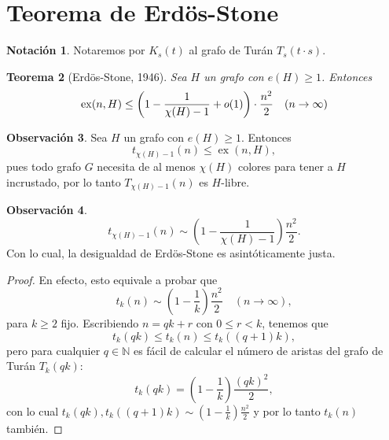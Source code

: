 \documentclass[12pt]{report}
\theoremstyle{plain}
\newtheorem{theorem}{Teorema}[section]
\theoremstyle{definition}
\newtheorem{obs}[theorem]{Observación}
\newtheorem{notation}[theorem]{Notación}
\newcommand{\naturals}{\mathbb{N}}
\newcommand{\ex}[2]{\operatorname{ex} (#1, #2)}
\begin{document}
\section{Teorema de Erdös-Stone}


\begin{notation}
Notaremos por $K_s (t)$ al grafo de Turán $T_{s} (t \cdot s)$.
\end{notation}

\begin{theorem}[Erdös-Stone, 1946]
Sea $H$ un grafo con $e(H) \geq 1$. Entonces
\[
    \ex n H \leq \left ( 1 - \frac{1}{\chi (H) - 1}  + o (1) \right) \cdot \frac{n^2}{2} \quad (n \to \infty) \\
\]
\end{theorem}

\begin{obs}
Sea $H$ un grafo con $e(H) \geq 1$. Entonces
\[
    t_{\chi (H) -1} (n) \leq \ex n H,
\]
pues todo grafo $G$ necesita de al menos $\chi (H)$ colores para tener a $H$ incrustado, por lo tanto $T_{\chi (H) - 1} (n)$ es $H$-libre.
\end{obs}

\begin{obs}\label{obs:tenemos que el numero de turan es asintotico a (1-1/r)n2/2}
\[
t_{\chi (H) - 1 } (n) \sim \left ( 1 - \frac{1}{\chi (H)- 1}\right ) \frac{n^2}{2}.
\]
Con lo cual, la desigualdad de Erdös-Stone es asintóticamente justa.
\end{obs}
\begin{proof}
En efecto, esto equivale a probar que
\[
    t_{k} (n) \sim \left (1 - \frac 1 {k} \right ) \frac{n^2}{2} \quad (n \to \infty),
\]
para $k \geq 2$ fijo. Escribiendo $n = q k + r$ con $0 \leq r < k$, tenemos que
\[
    t_k (q k) \leq t_k (n) \leq t_k((q+1)k),
\]
pero para cualquier $q \in \naturals$ es fácil de calcular el número de aristas del grafo de Turán $T_k (q k)$:
\[
    t_k (q k) = \left ( 1 - \frac 1 k \right ) \frac{(q k)^2}{2},
\]
con lo cual $t_k (q k) , t_k ((q+1)k) \sim \left ( 1 - \frac 1 k \right)  \frac {n^2}{2}$ y por lo tanto $t_k (n)$ también.
\end{proof}
\end{document}

